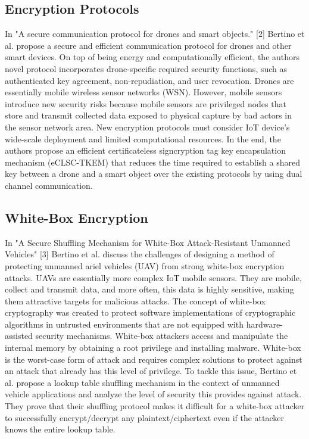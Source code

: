 \documentclass[journal,onecolumn]{IEEEtran}
\begin{document}
\subsection{Encryption Protocols}

In "A secure communication protocol for drones and smart objects." [2] Bertino et al. propose a secure and efficient communication protocol for drones and other smart devices. On top of being energy and computationally efficient, the authors novel protocol incorporates drone-specific required security functions, such as authenticated key agreement, non-repudiation, and user revocation. Drones are essentially mobile wireless sensor networks (WSN). However, mobile sensors introduce new security risks because mobile sensors are privileged nodes that store and transmit collected data exposed to physical capture by bad actors in the sensor network area. New encryption protocols must consider IoT device's wide-scale deployment and limited computational resources. In the end, the authors propose an efficient certificateless signcryption tag key encapsulation mechanism (eCLSC-TKEM) that reduces the time required to establish a shared key between a drone and a smart object over the existing protocols by using dual channel communication. 

\subsection{White-Box Encryption}

In "A Secure Shuffling Mechanism for White-Box Attack-Resistant Unmanned Vehicles" [3] Bertino et al. discuss the challenges of designing a method of protecting unmanned ariel vehicles (UAV) from strong white-box encryption attacks. UAVs are essentially more complex IoT mobile sensors. They are mobile, collect and transmit data, and more often, this data is highly sensitive, making them attractive targets for malicious attacks. The concept of white-box cryptography was created to protect software implementations of cryptographic algorithms in untrusted environments that are not equipped with hardware-assisted security mechanisms. White-box attackers access and manipulate the internal memory by obtaining a root privilege and installing malware. White-box is the worst-case form of attack and requires complex solutions to protect against an attack that already has this level of privilege. To tackle this issue, Bertino et al. propose a lookup table shuffling mechanism in the context of unmanned vehicle applications and analyze the level of security this provides against attack. They prove that their shuffling protocol makes it difficult for a white-box attacker to successfully encrypt/decrypt any plaintext/ciphertext even if the attacker knows the entire lookup table.
\end{document}
